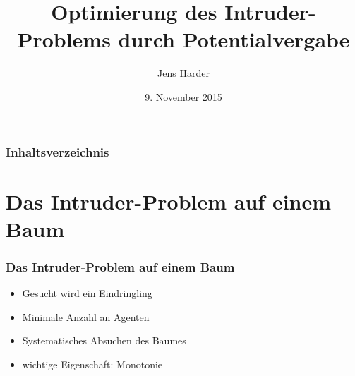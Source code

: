 \documentclass{beamer}
\title[Intruder-Problem mit Potentialvergabe]{Optimierung des Intruder-Problems durch Potentialvergabe}
\author{Jens Harder}
\date{9. November 2015}
\newtheorem{mydef}[counter]{Definition}
\begin{document}
	
	
	\begin{frame}
		\titlepage
	\end{frame}
	
	\begin{frame}
		\frametitle{Inhaltsverzeichnis}
		\large
		
		\tableofcontents
	\end{frame}
	
	\section{Das Intruder-Problem auf einem Baum}
	\begin{frame}
		\frametitle{Das Intruder-Problem auf einem Baum}
		\large
		\begin{itemize}
			\item Gesucht wird ein Eindringling
			
			\item Minimale Anzahl an Agenten
			
			\item Systematisches Absuchen des Baumes
			
			\item wichtige Eigenschaft: Monotonie

		\end{itemize}
	\end{frame}
		
%		
	
\end{document}
